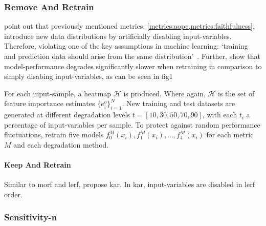 \subsubsection{Remove And Retrain}\label{metrics:roar}
\citeauthor{Hooker.2019} point out that previously mentioned metrics, \cref{metrics:aopc,metrics:faithfulness}, introduce new data distributions by artificially disabling input-variables. Therefore, violating one of the key assumptions in machine learning: `training and prediction data should arise from the same distribution'~\cite{McGaughey.2016}. Further, \citeauthor{Hooker.2019} show that model-performance degrades significantly slower when retraining in comparison to simply disabing input-variables, as can be seen in fig1
\par
For each input-sample, a heatmap \(\mathscr H\) is produced. Where again,
\(\mathscr H\) is the set of feature importance estimates \( \{ e^{o}_{i} \}^N_{i=1} \). New training and test datasets are generated at different degradation levels \(t=\left[10, 30, 50, 70, 90 \right]\), with each \(t_i\) a percentage of input-variables per sample. To protect against random performance fluctuations, \citeauthor{Hooker.2019} retrain five models \(f_0^M(x_i), f_1^M(x_i),\ldots, f_4^M(x_i)\) for each metric \(M\) and each degradation method.

\paragraph{Keep And Retrain}
Similar to \gls{morf} and \gls{lerf}, \citeauthor{Hooker.2019} propose \gls{kar}. In \gls{kar}, input-variables are disabled in \gls{lerf} order.

\subsubsection{Sensitivity-n}
\citeauthor{Ancona.}
\blindtext[1]

